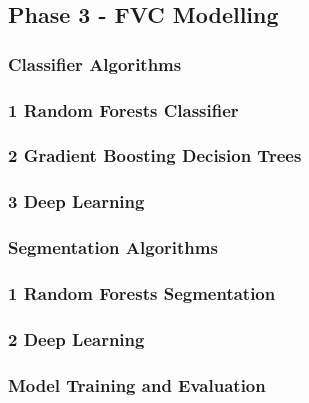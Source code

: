 \subsection{Phase 3 - FVC Modelling}\label{sec:model}
\subsubsection{Classifier Algorithms}
\subsubsection{1 Random Forests Classifier}


\subsubsection{2 Gradient Boosting Decision Trees} 


\subsubsection{3 Deep Learning} 


\subsubsection{Segmentation Algorithms}
\subsubsection{1 Random Forests Segmentation}


\subsubsection{2 Deep Learning}


\subsubsection{Model Training and Evaluation} 